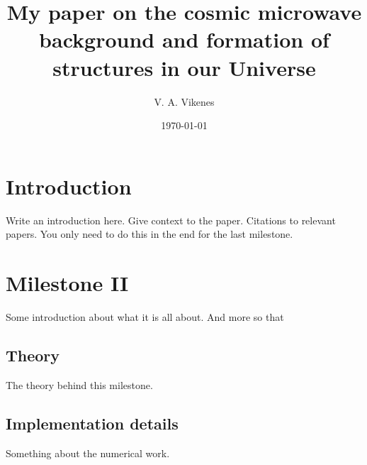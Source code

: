 

 

   \title{My paper on the cosmic microwave background and formation of structures in our Universe}

   \author{V. A. Vikenes}


   \date{\today}



   \maketitle

\section{Introduction}
Write an introduction here. Give context to the paper. Citations to relevant papers. You only need to do this in the end for the last milestone.









\section{Milestone II} 
Some introduction about what it is all about. And more so that 


\subsection{Theory}
The theory behind this milestone.

\subsection{Implementation details}
Something about the numerical work.

